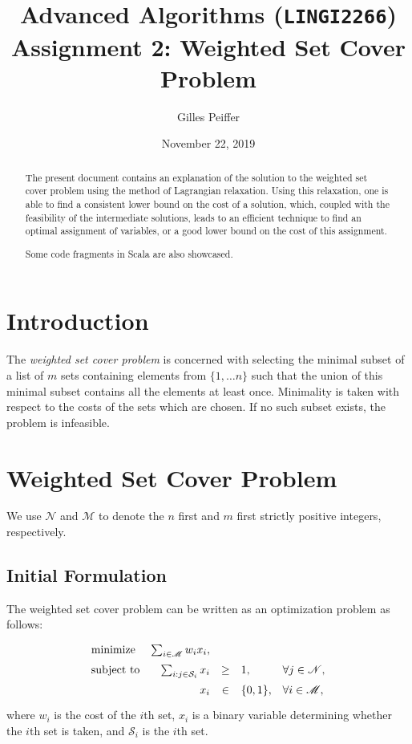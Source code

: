 \documentclass[journal]{IEEEtran}
\title{Advanced Algorithms (\texttt{LINGI2266}) \\ Assignment 2: Weighted Set Cover Problem}
\author{Gilles Peiffer}
\date{November 22, 2019}
\begin{document}
\maketitle

\begin{abstract}
	The present document contains an explanation of the solution to the weighted set cover problem using the method of Lagrangian relaxation.
	Using this relaxation, one is able to find a consistent lower bound on the cost of a solution, which, coupled with the feasibility of the intermediate solutions, leads to an efficient technique to find an optimal assignment of variables, or a good lower bound on the cost of this assignment.
	
	Some code fragments in Scala are also showcased.
\end{abstract}

\section{Introduction}
\label{sec:intro}
The \emph{weighted set cover problem} is concerned with selecting the minimal subset of a list of \(m\) sets containing elements from \(\{1, \ldots n\}\) such that the union of this minimal subset contains all the elements at least once.
Minimality is taken with respect to the costs of the sets which are chosen.
If no such subset exists, the problem is infeasible.

\section{Weighted Set Cover Problem}
We use \(\mathscr{N}\) and \(\mathscr{M}\) to denote the \(n\) first and \(m\) first strictly positive integers, respectively.

\subsection{Initial Formulation}
The weighted set cover problem can be written as an optimization problem as follows:
\[
\renewcommand{\arraystretch}{1.5}
\begin{array}{lrcl@{\quad}l}
\textnormal{minimize} & \sum_{i \in \mathscr{M}} w_i x_i, &&&\\
\textnormal{subject to} & \sum_{i : j \in \mathcal{S}_i} x_i & \ge & 1, & \forall j \in \mathscr{N},\\
& x_i &\in& \{0, 1\}, & \forall i \in \mathscr{M},
\end{array}
\]
where \(w_i\) is the cost of the \(i\)th set, \(x_i\) is a binary variable determining whether the \(i\)th set is taken, and \(\mathcal{S}_i\) is the \(i\)th set.
\end{document}
